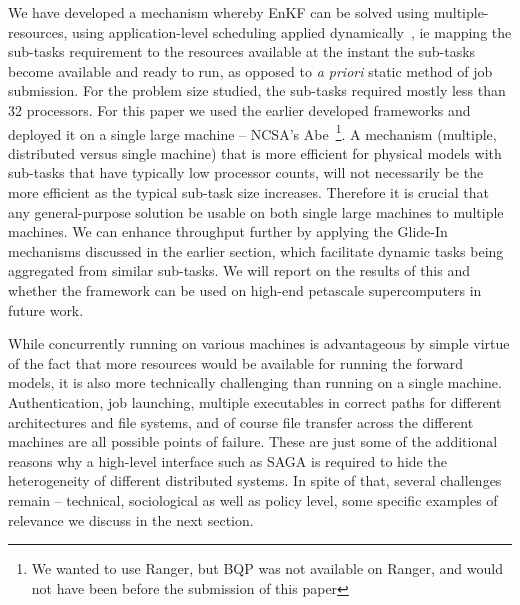 \documentclass{llncs}
\begin{document}
We have developed a mechanism whereby EnKF can be solved using
multiple-resources, using application-level scheduling applied
dynamically~\cite{saga_tg08}, ie mapping the sub-tasks requirement to
the resources available at the instant the sub-tasks become available
and ready to run, as opposed to {\it a priori} static method of job
submission.  For the problem size studied, the sub-tasks required
mostly less than 32 processors. For this paper we used the earlier
developed frameworks and deployed it on a single large machine --
NCSA's Abe~\footnote{We wanted to use Ranger, but BQP was not
  available on Ranger, and would not have been before the submission
  of this paper}. %
A mechanism (multiple, distributed versus single machine) that is more
efficient for physical models with sub-tasks that have typically low
processor counts, will not necessarily be the more efficient as the
typical sub-task size increases. Therefore it is crucial that any
general-purpose solution be usable on both single large machines to
multiple machines.    We can
enhance throughput further by applying the Glide-In mechanisms
discussed in the earlier section, which facilitate dynamic tasks being
aggregated from similar sub-tasks. We will report on the results of
this and whether the framework can be used on high-end petascale
supercomputers in future work.


While concurrently running on various machines is advantageous by
simple virtue of the fact that more resources would be available for
running the forward models, it is also more technically challenging
than running on a single machine.  Authentication, job launching,
multiple executables in correct paths for different architectures and
file systems, and of course file transfer across the different
machines are all possible points of failure. %
These are just some of the additional reasons why a high-level
interface such as SAGA is required to hide the heterogeneity of
different distributed systems. In spite of that, several challenges
remain -- technical, sociological as well as policy level, some
specific examples of relevance we discuss in the next section.
\end{document}
